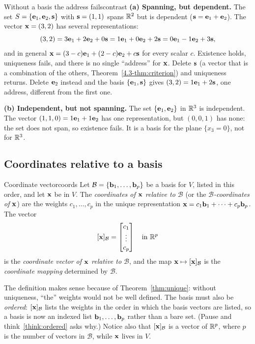 \documentclass[11pt]{article}
\begin{document}
\begin{exmp}{Without a basis the address fails}{contrast}
\textbf{(a) Spanning, but dependent.} The set $S=\{\mathbf{e}_1,\mathbf{e}_2,\mathbf{s}\}$ with $\mathbf{s}=(1,1)$ spans $\mathbb{R}^2$ but is dependent ($\mathbf{s}=\mathbf{e}_1+\mathbf{e}_2$). The vector $\mathbf{x}=(3,2)$ has several representations:
\[
(3,2)=3\mathbf{e}_1+2\mathbf{e}_2+0\mathbf{s}=1\mathbf{e}_1+0\mathbf{e}_2+2\mathbf{s}=0\mathbf{e}_1-1\mathbf{e}_2+3\mathbf{s},
\]
and in general $\mathbf{x}=(3-c)\mathbf{e}_1+(2-c)\mathbf{e}_2+c\mathbf{s}$ for every scalar $c$. Existence holds, uniqueness fails, and there is no single ``address'' for $\mathbf{x}$. Delete $\mathbf{s}$ (a vector that is a combination of the others, Theorem~\ref{4.3-thm:criterion}) and uniqueness returns. Delete $\mathbf{e}_2$ instead and the basis $\{\mathbf{e}_1,\mathbf{s}\}$ gives $(3,2)=1\mathbf{e}_1+2\mathbf{s}$, one address, different from the first one.

\textbf{(b) Independent, but not spanning.} The set $\{\mathbf{e}_1,\mathbf{e}_2\}$ in $\mathbb{R}^3$ is independent. The vector $(1,1,0)=1\mathbf{e}_1+1\mathbf{e}_2$ has one representation, but $(0,0,1)$ has none: the set does not span, so existence fails. It is a basis for the plane $\{x_3=0\}$, not for $\mathbb{R}^3$.
\end{exmp}

\subsection*{Coordinates relative to a basis}

\begin{defn}{Coordinate vector}{coords}
Let $\mathcal{B}=\{\mathbf{b}_1,\dots,\mathbf{b}_p\}$ be a basis for $V$, listed in this order, and let $\mathbf{x}$ be in $V$. The \emph{coordinates of $\mathbf{x}$ relative to $\mathcal{B}$} (or the \emph{$\mathcal{B}$-coordinates of $\mathbf{x}$}) are the weights $c_1,\dots,c_p$ in the unique representation $\mathbf{x}=c_1\mathbf{b}_1+\cdots+c_p\mathbf{b}_p$. The vector
\[
[\mathbf{x}]_{\mathcal{B}}=\begin{bmatrix}c_1\\\vdots\\c_p\end{bmatrix}\quad\text{in }\mathbb{R}^p
\]
is the \emph{coordinate vector of $\mathbf{x}$ relative to $\mathcal{B}$}, and the map $\mathbf{x}\mapsto[\mathbf{x}]_{\mathcal{B}}$ is the \emph{coordinate mapping} determined by $\mathcal{B}$.
\end{defn}

The definition makes sense because of Theorem~\ref{thm:unique}: without uniqueness, ``the'' weights would not be well defined. The basis must also be \emph{ordered}: $[\mathbf{x}]_{\mathcal{B}}$ lists the weights in the order in which the basis vectors are listed, so a basis is now an indexed list $\mathbf{b}_1,\dots,\mathbf{b}_p$ rather than a bare set. (Pause and think~\ref{think:ordered} asks why.) Notice also that $[\mathbf{x}]_{\mathcal{B}}$ is a vector of $\mathbb{R}^p$, where $p$ is the number of vectors in $\mathcal{B}$, while $\mathbf{x}$ lives in $V$.
\end{document}

